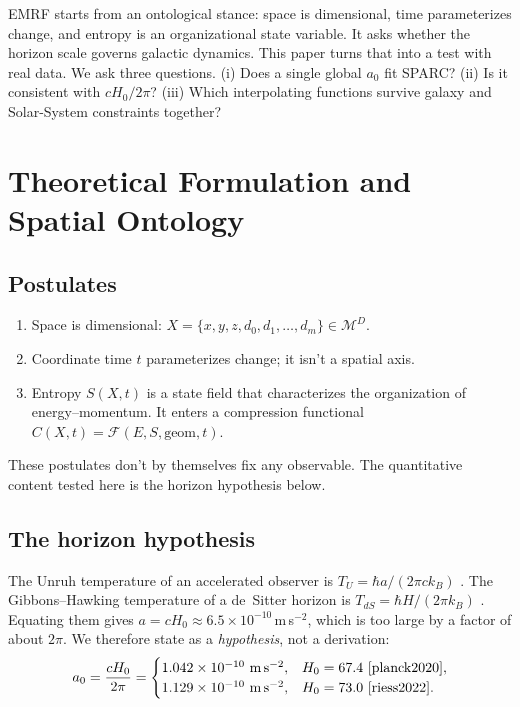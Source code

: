 \documentclass[11pt,a4paper]{article}
\begin{document}
EMRF starts from an ontological stance: space is dimensional, time parameterizes change, and entropy is an organizational state variable. It asks whether the horizon scale governs galactic dynamics. This paper turns that into a test with real data. We ask three questions. (i) Does a single global $a_0$ fit SPARC? (ii) Is it consistent with $cH_0/2\pi$? (iii) Which interpolating functions survive galaxy and Solar-System constraints together?

\section{Theoretical Formulation and Spatial Ontology}
\label{sec:theory}

\subsection{Postulates}
\begin{enumerate}
\item Space is dimensional: $X = \{x, y, z, d_0, d_1, \dots, d_m\} \in \mathcal{M}^D$.
\item Coordinate time $t$ parameterizes change; it isn't a spatial axis.
\item Entropy $S(X,t)$ is a state field that characterizes the organization of energy--momentum. It enters a compression functional $C(X,t) = \mathcal{F}(E, S, \mathrm{geom}, t)$.
\end{enumerate}
These postulates don't by themselves fix any observable. The quantitative content tested here is the horizon hypothesis below.

\subsection{The horizon hypothesis}
The Unruh temperature of an accelerated observer is $T_U = \hbar a/(2\pi c k_B)$ \cite{unruh1976}. The Gibbons--Hawking temperature of a de~Sitter horizon is $T_{dS} = \hbar H/(2\pi k_B)$ \cite{gibbons1977}. Equating them gives $a = cH_0 \approx 6.5\times10^{-10}$\,m\,s$^{-2}$, which is too large by a factor of about $2\pi$. We therefore state as a \emph{hypothesis}, not a derivation:
\begin{equation}
a_0 = \frac{cH_0}{2\pi} =
\begin{cases}
1.042\times10^{-10}\ \mathrm{m\,s^{-2}}, & H_0 = 67.4\ \text{\cite{planck2020}},\\
1.129\times10^{-10}\ \mathrm{m\,s^{-2}}, & H_0 = 73.0\ \text{\cite{riess2022}}.
\end{cases}
\label{eq:horizon}
\end{equation}
\end{document}
